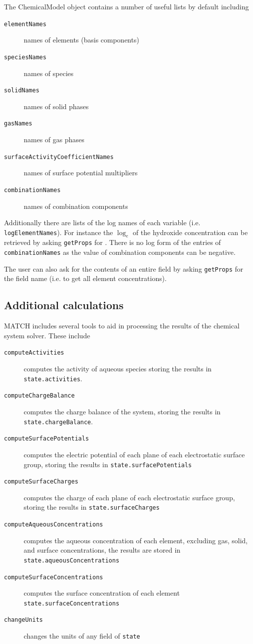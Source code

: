 \documentclass{article}
\begin{document}
The ChemicalModel object contains a number of useful lists by default including
\begin{description}
        \item[\texttt{elementNames}] names of elements (basis components)
        \item[\texttt{speciesNames}] names of species
        \item[\texttt{solidNames}] names of solid phases
        \item[\texttt{gasNames}] names of gas phases
        \item[\texttt{surfaceActivityCoefficientNames}] names of surface potential multipliers
        \item[\texttt{combinationNames}] names of combination components
\end{description}
Additionally there are lists of the log names of each variable (i.e. \verb|logElementNames|). For instance the $\log_e$ of the hydroxide concentration can be retrieved by asking \verb|getProps| for . There is no log form of the entries of \verb|combinationNames| as the value of combination components can be negative. 

The user can also ask for the contents of an entire field by asking \verb|getProps| for the field name (i.e.  to get all element concentrations).

\subsection{Additional calculations}

MATCH includes several tools to aid in processing the results of the chemical system solver. These include

\begin{description}
        \item[\texttt{computeActivities}] computes the activity of aqueous species storing the results in \verb|state.activities|.
        \item[\texttt{computeChargeBalance}] computes the charge balance of the system, storing the results in \verb|state.chargeBalance|.
        \item[\texttt{computeSurfacePotentials}] computes the electric potential of each plane of each electrostatic surface group, storing the results in \verb|state.surfacePotentials|
        \item[\texttt{computeSurfaceCharges}] computes the charge of each plane of each electrostatic surface group, storing the results in \verb|state.surfaceCharges|
        \item[\texttt{computeAqueousConcentrations}] computes the aqueous concentration of each element, excluding gas, solid, and surface concentrations, the results are stored in \verb|state.aqueousConcentrations|
        \item[\texttt{computeSurfaceConcentrations}] computes the surface concentration of each element \verb|state.surfaceConcentrations|
        \item[\texttt{changeUnits}] changes the units of any field of \verb|state|
\end{description}
\end{document}
